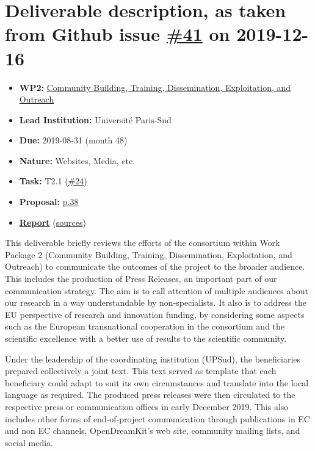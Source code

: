 \hypertarget{deliverable-description-as-taken-from-github-issue-41-on-2019-12-16}{%
\section*{\texorpdfstring{Deliverable description, as taken from Github
issue
\href{https://github.com/OpenDreamKit/OpenDreamKit/issues/41}{\#41} on
2019-12-16}{Deliverable description, as taken from Github issue \#41 on 2019-12-16}}\label{deliverable-description-as-taken-from-github-issue-41-on-2019-12-16}}

\begin{itemize}
\tightlist
\item
  \textbf{WP2:}
  \href{https://github.com/OpenDreamKit/OpenDreamKit/tree/master/WP2}{Community
  Building, Training, Dissemination, Exploitation, and Outreach}
\item
  \textbf{Lead Institution:} Université Paris-Sud
\item
  \textbf{Due:} 2019-08-31 (month 48)
\item
  \textbf{Nature:} Websites, Media, etc.
\item
  \textbf{Task:} T2.1
  (\href{https://github.com/OpenDreamKit/OpenDreamKit/issues/24}{\#24})
\item
  \textbf{Proposal:}
  \href{https://github.com/OpenDreamKit/OpenDreamKit/raw/master/Proposal/proposal-www.pdf}{p.38}
\item
  \textbf{\href{https://github.com/OpenDreamKit/OpenDreamKit/raw/master/WP2/D2.16/report-final.pdf}{Report}}
  (\href{https://github.com/OpenDreamKit/OpenDreamKit/raw/master/WP2/D2.16/}{sources})
\end{itemize}

This deliverable briefly reviews the efforts of the consortium within
Work Package 2 (Community Building, Training, Dissemination,
Exploitation, and Outreach) to communicate the outcomes of the project
to the broader audience. This includes the production of Press Releases,
an important part of our communication strategy. The aim is to call
attention of multiple audiences about our research in a way
understandable by non-specialists. It also is to address the EU
perspective of research and innovation funding, by considering some
aspects such as the European transnational cooperation in the consortium
and the scientific excellence with a better use of results to the
scientific community.

Under the leadership of the coordinating institution (UPSud), the
beneficiaries prepared collectively a joint text. This text served as
template that each beneficiary could adapt to suit its own circumstances
and translate into the local language as required. The produced press
releases were then circulated to the respective press or communication
offices in early December 2019. This also includes other forms of
end-of-project communication through publications in EC and non EC
channels, OpenDreamKit's web site, community mailing lists, and social
media.
